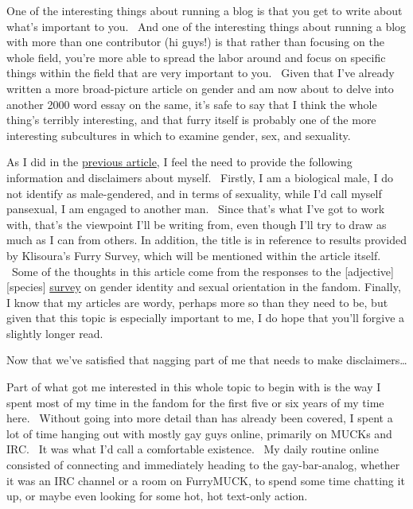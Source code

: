 One of the interesting things about running a blog is that you get to
write about what's important to you. ~And one of the interesting things
about running a blog with more than one contributor (hi guys!) is that
rather than focusing on the whole field, you're more able to spread the
labor around and focus on specific things within the field that are very
important to you. ~Given that I've already written a more broad-picture
article on gender and am now about to delve into another 2000 word essay
on the same, it's safe to say that I think the whole thing's terribly
interesting, and that furry itself is probably one of the more
interesting subcultures in which to examine gender, sex, and sexuality.

As I did in the
\href{http://adjectivespecies.com/2011/11/16/boys-girls-and-the-in-betweens/}{previous
article}, I feel the need to provide the following information and
disclaimers about myself. ~Firstly, I am a biological male, I do not
identify as male-gendered, and in terms of sexuality, while I'd call
myself pansexual, I am engaged to another man. ~Since that's what I've
got to work with, that's the viewpoint I'll be writing from, even though
I'll try to draw as much as I can from others. In addition, the title is
in reference to results provided by Klisoura's Furry Survey, which will
be mentioned within the article itself. ~Some of the thoughts in this
article come from the responses to the {[}adjective{]}{[}species{]}
\href{http://survey.adjectivespecies.com/sexuality-and-gender}{survey}
on gender identity and sexual orientation in the fandom. Finally, I know
that my articles are wordy, perhaps more so than they need to be, but
given that this topic is especially important to me, I do hope that
you'll forgive a slightly longer read.

Now that we've satisfied that nagging part of me that needs to make
disclaimers\ldots{}

Part of what got me interested in this whole topic to begin with is the
way I spent most of my time in the fandom for the first five or six
years of my time here. ~Without going into more detail than has already
been covered, I spent a lot of time hanging out with mostly gay guys
online, primarily on MUCKs and IRC. ~It was what I'd call a comfortable
existence. ~My daily routine online consisted of connecting and
immediately heading to the gay-bar-analog, whether it was an IRC channel
or a room on FurryMUCK, to spend some time chatting it up, or maybe even
looking for some hot, hot text-only action.


